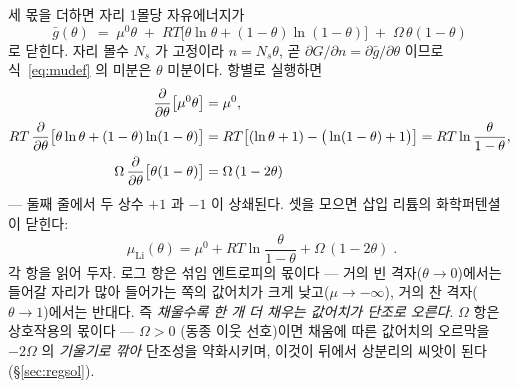 \documentclass[11pt,a4paper]{article}
\begin{document}
세 몫을 더하면 자리 1몰당 자유에너지가
\begin{equation}
\bar g(\theta)\;=\;\mu^0\theta\;+\;RT\big[\theta\ln\theta+(1-\theta)\ln(1-\theta)\big]
\;+\;\Omega\,\theta(1-\theta)
\label{eq:gbar}
\end{equation}
로 닫힌다. 자리 몰수 $N_s$ 가 고정이라 $n=N_s\theta$, 곧
$\partial G/\partial n=\partial\bar g/\partial\theta$ 이므로 식~\eqref{eq:mudef} 의 미분은
$\theta$ 미분이다. 항별로 실행하면
\begin{align}
\frac{\partial}{\partial\theta}\big[\mu^0\theta\big]&=\mu^0,\notag\\
RT\,\frac{\partial}{\partial\theta}\big[\theta\ln\theta+(1-\theta)\ln(1-\theta)\big]
&=RT\big[(\ln\theta+1)-\big(\ln(1-\theta)+1\big)\big]=RT\ln\frac{\theta}{1-\theta},
\label{eq:mixderiv}\\
\Omega\,\frac{\partial}{\partial\theta}\big[\theta(1-\theta)\big]&=\Omega\,(1-2\theta)
\notag
\end{align}
— 둘째 줄에서 두 상수 $+1$ 과 $-1$ 이 상쇄된다. 셋을 모으면 삽입 리튬의 화학퍼텐셜이 닫힌다:
\begin{equation}
\boxed{\;\mu_{\mathrm{Li}}(\theta)=\mu^0+RT\ln\frac{\theta}{1-\theta}+\Omega\,(1-2\theta)\;.}
\label{eq:mu}
\end{equation}
각 항을 읽어 두자. 로그 항은 섞임 엔트로피의 몫이다 — 거의 빈 격자($\theta\to0$)에서는 들어갈 자리가
많아 들어가는 쪽의 값어치가 크게 낮고($\mu\to-\infty$), 거의 찬 격자($\theta\to1$)에서는 반대다. 즉
\emph{채울수록 한 개 더 채우는 값어치가 단조로 오른다}. $\Omega$ 항은 상호작용의 몫이다 — $\Omega>0$
(동종 이웃 선호)이면 채움에 따른 값어치의 오르막을 $-2\Omega$ 의 \emph{기울기로 깎아} 단조성을
약화시키며, 이것이 뒤에서 상분리의 씨앗이 된다(\S\ref{sec:regsol}).
\end{document}
